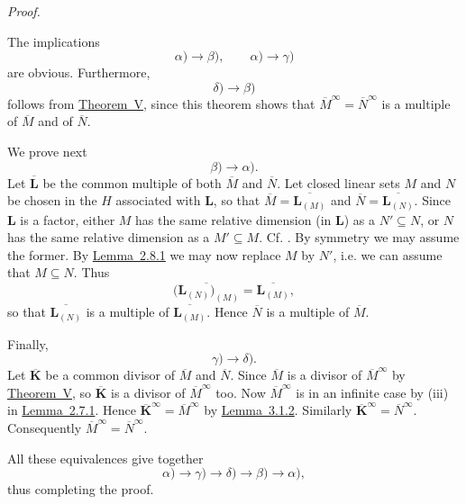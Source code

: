 \documentclass[b5paper,twoside]{article}
\newcommand{\thmref}[2]{\hyperref[#1]{\mbox{Theorem~#2}}}
\newcommand{\lemref}[2]{\hyperref[#1]{\mbox{Lemma~#2}}}
\theoremstyle{mvnplain}
\renewenvironment{proof}[1][Proof]{%
  \par\addvspace{0.35\baselineskip}%
  \noindent\textit{#1.}\ \normalfont\ignorespaces
}{%
  \par\addvspace{0.35\baselineskip}%
}
\newcommand{\M}{\mathbf M}
\newcommand{\N}{\mathbf N}
\newcommand{\Hilbert}{\mathfrak H}
\def\M{M}%
\def\N{N}%
\def\Hilbert{H}%
\def\mathfrak#1{#1}%
\begin{document}
\begin{proof}
The implications
\[
  \alpha)\longrightarrow\beta),\qquad
  \alpha)\longrightarrow\gamma)
\]
are obvious. Furthermore,
\[
  \delta)\longrightarrow\beta)
\]
follows from \thmref{thm:V}{V}, since this theorem shows that
\(\overline{\M}^{\infty}=\overline{\N}^{\infty}\) is a multiple of
\(\overline{\M}\) and of \(\overline{\N}\).

We prove next
\[
  \beta)\longrightarrow\alpha).
\]
Let \(\overline{\mathbf L}\) be the common multiple of both \(\overline{\M}\) and
\(\overline{\N}\). Let closed linear sets \(\mathfrak M\) and
\(\mathfrak N\) be chosen in the \(\Hilbert\) associated with \(\mathbf L\), so that
\(\overline{\M}=\overline{\mathbf L_{(\mathfrak M)}}\) and
\(\overline{\N}=\overline{\mathbf L_{(\mathfrak N)}}\). Since \(\mathbf L\) is a factor,
either \(\mathfrak M\) has the same relative dimension (in \(\mathbf L\)) as a
\(\mathfrak N'\subseteq\mathfrak N\), or \(\mathfrak N\) has the same relative
dimension as a \(\mathfrak M'\subseteq\mathfrak M\). Cf.
\cite[p.~153, Lemma~6.2.3, or p.~154, Theorem~VI]{ref5}. By symmetry we may
assume the former. By \lemref{lem:2.8.1}{2.8.1} we may now replace
\(\mathfrak M\) by \(\mathfrak N'\), i.e. we can assume that
\(\mathfrak M\subseteq\mathfrak N\).
Thus
\[
  \overline{\bigl(\mathbf L_{(\mathfrak N)}\bigr)_{(\mathfrak M)}}
  =\overline{\mathbf L_{(\mathfrak M)}},
\]
so that \(\overline{\mathbf L_{(\mathfrak N)}}\) is a multiple of
\(\overline{\mathbf L_{(\mathfrak M)}}\). Hence \(\overline{\N}\) is a multiple of
\(\overline{\M}\).

Finally,
\[
  \gamma)\longrightarrow\delta).
\]
Let \(\overline{\mathbf K}\) be a common divisor of \(\overline{\M}\) and
\(\overline{\N}\). Since \(\overline{\M}\) is a divisor of
\(\overline{\M}^{\infty}\) by \thmref{thm:V}{V}, so
\(\overline{\mathbf K}\) is a divisor of \(\overline{\M}^{\infty}\) too. Now
\(\overline{\M}^{\infty}\) is in an infinite case by (iii) in
\lemref{lem:2.7.1}{2.7.1}. Hence
\(\overline{\mathbf K}^{\infty}=\overline{\M}^{\infty}\) by
\lemref{lem:3.1.2}{3.1.2}. Similarly
\(\overline{\mathbf K}^{\infty}=\overline{\N}^{\infty}\). Consequently
\(\overline{\M}^{\infty}=\overline{\N}^{\infty}\).

All these equivalences give together
\[
  \alpha)\longrightarrow\gamma)\longrightarrow\delta)
  \longrightarrow\beta)\longrightarrow\alpha),
\]
thus completing the proof.
\end{proof}
\end{document}
